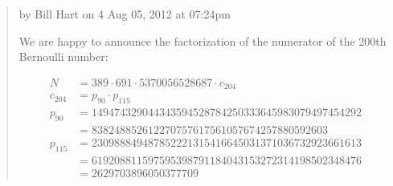 \documentclass[openany]{book}
\theoremstyle{plain}
\theoremstyle{definition}
\begin{document}
{\begin{quote}
by Bill Hart on 4 Aug 05, 2012 at 07:24pm

We are happy to announce the factorization of the numerator of the 200th
Bernoulli number:

\begin{align*}
N &= 389 \cdot 691 \cdot 5370056528687 \cdot c_{204}\\
c_{204} &= p_{90} \cdot p_{115}\\
p_{90}  &= 149474329044343594528784250333645983079497454292\\
        &= 838248852612270757617561057674257880592603\\
p_{115} &= 230988849487852221315416645031371036732923661613\\
        &= 619208811597595398791184043153272314198502348476\\
        &= 2629703896050377709
\end{align*}


\end{quote}}
\end{document}
